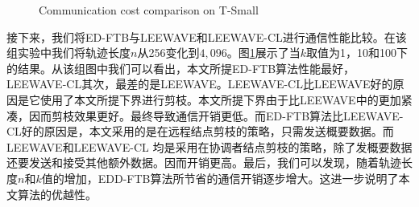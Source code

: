 \begin{figure}
	\centering
{}
\caption{Communication cost comparison on {T-Small}}
\label{fig:costCmp}
\end{figure}
接下来，我们将ED-FTB与LEEWAVE和LEEWAVE-CL进行通信性能比较。在该组实验中我们将轨迹长度$n$从256变化到$4,096$。图\ref{fig:costCmp}展示了当$k$取值为1，10和100下的结果。从该组图中我们可以看出，本文所提ED-FTB算法性能最好，LEEWAVE-CL其次，最差的是LEEWAVE。LEEWAVE-CL比LEEWAVE好的原因是它使用了本文所提下界进行剪枝。本文所提下界由于比LEEWAVE中的更加紧凑，因而剪枝效果更好。最终导致通信开销更低。而ED-FTB算法比LEEWAVE-CL好的原因是，本文采用的是在远程结点剪枝的策略，只需发送概要数据。而LEEWAVE和LEEWAVE-CL 均是采用在协调者结点剪枝的策略，除了发概要数据还要发送和接受其他额外数据。因而开销更高。最后，我们可以发现，随着轨迹长度$n$和$k$值的增加，EDD-FTB算法所节省的通信开销逐步增大。这进一步说明了本文算法的优越性。

